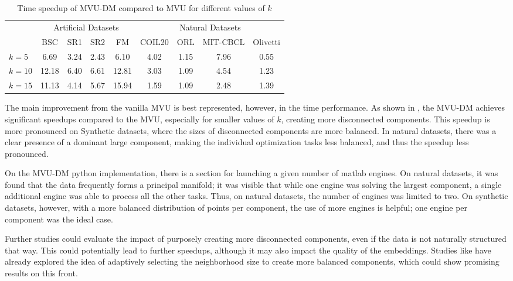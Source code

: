         \begin{table}[t]
        \caption{Time speedup of MVU-DM compared to MVU for different values of $k$}
        \label{tab:speedup}
        \begin{center}
        \begin{tabular}{|l|c|c|c|c||c|c|c|c|}
        \hline
        \multicolumn{1}{|c|}{} & \multicolumn{4}{c||}{Artificial Datasets} & \multicolumn{4}{c|}{Natural Datasets} \\
            & BSC & SR1 & SR2 & FM & COIL20 & ORL & MIT-CBCL & Olivetti \\ \hline
            $k=5$ & 6.69 & 3.24 & 2.43 & 6.10 & 4.02 & 1.15 & 7.96 & 0.55 \\ \hline
            $k=10$ & 12.18 & 6.40 & 6.61 & 12.81 & 3.03 & 1.09 & 4.54 & 1.23 \\ \hline
            $k=15$ & 11.13 & 4.14 & 5.67 & 15.94 & 1.59 & 1.09 & 2.48 & 1.39 \\ \hline
        \end{tabular}
        \end{center}
        \end{table}




        The main improvement from the vanilla \ac{MVU} is best represented, however, in the time performance. As shown in , the \ac{MVU-DM} achieves significant speedups compared to the \ac{MVU}, especially for smaller values of $k$, creating more disconnected components. This speedup is more pronounced on Synthetic datasets, where the sizes of disconnected components are more balanced. In natural datasets, there was a clear presence of a dominant large component, making the individual optimization tasks less balanced, and thus the speedup less pronounced.

        On the \ac{MVU-DM} python implementation, there is a section for launching a given number of matlab engines. On natural datasets, it was found that the data frequently forms a principal manifold; it was visible that while one engine was solving the largest component, a single additional engine was able to process all the other tasks. Thus, on natural datasets, the number of engines was limited to two. On synthetic datasets, however, with a more balanced distribution of points per component, the use of more engines is helpful; one engine per component was the ideal case.

        Further studies could evaluate the impact of purposely creating more disconnected components, even if the data is not naturally structured that way. This could potentially lead to further speedups, although it may also impact the quality of the embeddings. Studies like \cite{adaptive} have already explored the idea of adaptively selecting the neighborhood size to create more balanced components, which could show promising results on this front.

